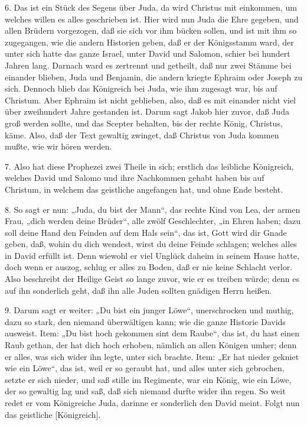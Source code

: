 6. Das ist ein Stück des Segens über Juda, da wird Christus mit einkommen, um welches willen es alles geschrieben ist. Hier wird nun Juda die Ehre gegeben, und allen Brüdern vorgezogen, daß sie sich vor ihm bücken sollen, und ist mit ihm so zugegangen, wie die andern Historien geben, daß er der Königsstamm ward, der unter sich hatte das ganze Israel, unter David und Salomon, schier bei hundert Jahren lang. Darnach ward es zertrennt und getheilt, daß nur zwei Stämme bei einander blieben, Juda und Benjamin, die andern kriegte Ephraim oder Joseph zu sich. Dennoch blieb das Königreich bei Juda, wie ihm zugesagt war, bis auf Christum. Aber Ephraim ist nicht geblieben, also, daß es mit einander nicht viel über zweihundert Jahre gestanden ist. Darum sagt Jakob hier zuvor, daß Juda groß werden sollte, und das Scepter behalten, bis der rechte König, Christus, käme. Also, daß der Text gewaltig zwinget, daß Christus von Juda kommen mußte, wie wir hören werden.

7. Also hat diese Prophezei zwei Theile in sich; erstlich das leibliche Königreich, welches David und Salomo und ihre Nachkommen gehabt haben bis auf Christum, in welchem das geistliche angefangen hat, und ohne Ende besteht.

8. So sagt er nun: „Juda, du bist der Mann“, das rechte Kind von Lea, der armen Frau, „dich werden deine Brüder“, alle zwölf Geschlechter, „in Ehren haben; dazu soll deine Hand den Feinden auf dem Hals sein“, das ist, Gott wird dir Gnade geben, daß, wohin du dich wendest, wirst du deine Feinde schlagen; welches alles in David erfüllt ist. Denn wiewohl er viel Unglück daheim in seinem Hause hatte, doch wenn er auszog, schlug er alles zu Boden, daß er nie keine Schlacht verlor. Also beschreibt der Heilige Geist so lange zuvor, wie er es treiben würde; denn es auf ihn sonderlich geht, daß ihn alle Juden sollten gnädigen Herrn heißen.

9. Darum sagt er weiter: „Du bist ein junger Löwe“, unerschrocken und muthig, dazu so stark, den niemand überwältigen kann; wie die ganze Historie Davids ausweist. Item: „Du bist hoch gekommen sint dem Raube“, das ist, du hast einen Raub gethan, der hat dich hoch erhoben, nämlich an allen Königen umher; denn er alles, was sich wider ihn legte, unter sich brachte. Item: „Er hat nieder gekniet wie ein Löwe“, das ist, weil er so geraubt hat, und alles unter sich gebrochen, setzte er sich nieder, und saß stille im Regimente, war ein König, wie ein Löwe, der so gewaltig lag und saß, daß sich niemand durfte wider ihn regen. So weit redet er vom Königreiche Juda, darinne er sonderlich den David meint. Folgt nun das geistliche [Königreich].

